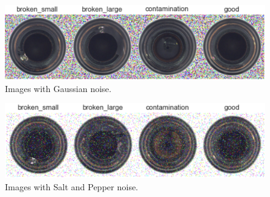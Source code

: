\begin{figure}[H]
    \centering
    \includegraphics[scale=0.55]{src/images/dataset_w_gnoise.png}
    \caption{Images with Gaussian noise.}
    \label{fig:Gnoise}
\end{figure}
\begin{figure}[H]
    \centering
    \includegraphics[scale=0.55]{src/images/dataset_w_snp.png}
    \caption{Images with Salt and Pepper noise.}
    \label{fig:snpnoise}
\end{figure}
